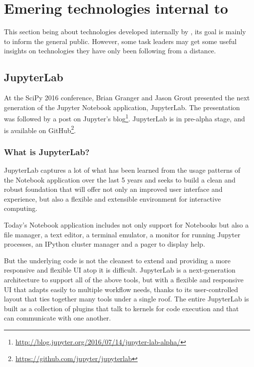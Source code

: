\documentclass{deliverablereport}
\begin{document}
\section{Emering technologies internal to \ODK}
\label{sec:internal}

This section being about technologies developed internally by \ODK,
its goal is mainly to inform the general public. However, some task
leaders may get some useful insights on technologies they have only
been following from a distance.

\subsection{JupyterLab}
\label{sec:jupyterlab}

At the SciPy 2016 conference, Brian Granger and Jason Grout presented
the next generation of the Jupyter Notebook application, JupyterLab.
The presentation was followed by a post on Jupyter's
blog\footnote{\url{http://blog.jupyter.org/2016/07/14/jupyter-lab-alpha/}}.
JupyterLab is in pre-alpha stage, and is available on
GitHub\footnote{\url{https://github.com/jupyter/jupyterlab}}.

\subsubsection{What is JupyterLab?}

JupyterLab captures a lot of what has been learned from the usage
patterns of the Notebook application over the last 5 years and seeks
to build a clean and robust foundation that will offer not only an
improved user interface and experience, but also a flexible and
extensible environment for interactive computing.

Today's Notebook application includes not only support for Notebooks
but also a file manager, a text editor, a terminal emulator, a monitor
for running Jupyter processes, an IPython cluster manager and a pager
to display help.  

But the underlying code is not the cleanest to extend and providing a
more responsive and flexible UI atop it is difficult. JupyterLab is a
next-generation architecture to support all of the above tools, but
with a flexible and responsive UI that adapts easily to multiple
workflow needs, thanks to its user-controlled layout that ties
together many tools under a single roof.  The entire JupyterLab is
built as a collection of plugins that talk to kernels for code
execution and that can communicate with one another.
\end{document}
